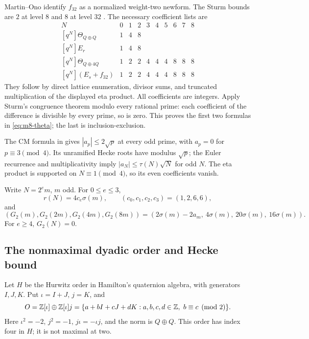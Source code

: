 Martin--Ono \cite[Theorem 1, level-32 row]{MartinOno} identify
\(f_{32}\) as a normalized weight-two newform.
The Sturm bounds are \(2\) at level \(8\) and \(8\) at level
\(32\) \cite[Theorem 1]{Sturm}. The necessary coefficient lists
are
\[
\begin{array}{c|rrrrrrrrr}
 N&0&1&2&3&4&5&6&7&8\\ \hline
 {}[q^N]\Theta_{Q\oplus Q}&1&4&8&&&&&&\\
 {}[q^N]E_r&1&4&8&&&&&&\\
 {}[q^N]\Theta_{Q\oplus4Q}&1&2&2&4&4&4&8&8&8\\
 {}[q^N](E_s+f_{32})&1&2&2&4&4&4&8&8&8
\end{array}
\]
They follow by direct lattice enumeration, divisor sums, and
truncated multiplication of the displayed eta product.
All coefficients are integers. Apply Sturm's congruence theorem
modulo every rational prime: each coefficient of the difference
is divisible by every prime, so is zero.
This proves the first two formulas in \eqref{eq:m8-theta};
the last is inclusion-exclusion.

The CM formula in \cite[Theorems 2 and 3]{MartinOno} gives
\(|a_p|\le2\sqrt p\) at every odd prime, with \(a_p=0\) for
\(p\equiv3\pmod4\). Its unramified Hecke roots have modulus
\(\sqrt p\); the Euler recurrence and multiplicativity imply
\(|a_N|\le\tau(N)\sqrt N\) for odd \(N\).
The eta product is supported on \(N\equiv1\pmod4\), so its
even coefficients vanish.

Write \(N=2^em\), \(m\) odd. For \(0\le e\le3\),
\[
 r(N)=4c_e\sigma(m),\qquad (c_0,c_1,c_2,c_3)=(1,2,6,6),
\]
and
\begin{equation}
 (G_2(m),G_2(2m),G_2(4m),G_2(8m))
   =(2\sigma(m)-2a_m,\ 4\sigma(m),\
                               20\sigma(m),\ 16\sigma(m)).     \label{eq:m8-dyadic}
\end{equation}
For \(e\ge4\), \(G_2(N)=0\).

\subsection{The nonmaximal dyadic order and Hecke bound}

Let \(H\) be the Hurwitz order in Hamilton's quaternion algebra,
with generators \(I,J,K\). Put \(\iota=I+J\), \(j=K\), and
\[
 O=\mathbb Z[\iota]\oplus\mathbb Z[\iota]j
   =\{a+bI+cJ+dK:a,b,c,d\in\mathbb Z,\ b\equiv c\pmod2\}.
\]
Here \(\iota^2=-2\), \(j^2=-1\), \(j\iota=-\iota j\),
and the norm is \(Q\oplus Q\).
This order has index four in \(H\); it is not maximal at two.

